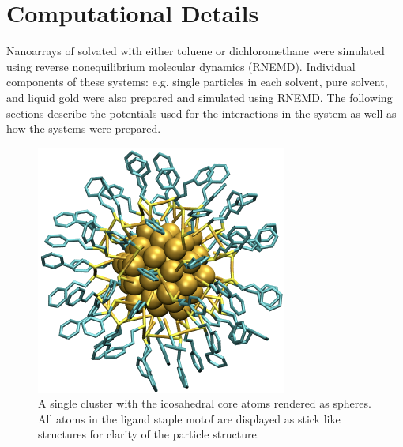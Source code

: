 \section{Computational Details}
Nanoarrays of  solvated with either toluene or dichloromethane were simulated using reverse nonequilibrium molecular dynamics (RNEMD).
Individual components of these systems: e.g. single particles in each solvent, pure solvent, and liquid gold were also prepared and simulated using RNEMD.
The following sections describe the potentials used for the interactions in the system as well as how the systems were prepared.

\begin{figure}
    \centering
    \includegraphics[scale=3]{figures/Au144-part.pdf}
    \caption{A single  cluster with the icosahedral core atoms rendered as spheres. All atoms in the ligand staple motof are displayed as stick like structures for clarity of the particle structure.}
    \label{fig:single-part}
\end{figure}

